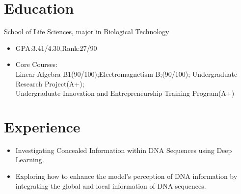 \documentclass{resume}
\begin{document}



\section{Education}

School of Life Sciences, major in Biological Technology 
\begin{itemize}
  \item GPA:3.41/4.30,Rank:27/90
  \item Core Courses: \\Linear Algebra B1(90/100);Electromagnetism B;(90/100); Undergraduate 
  Research Project(A+);\\Undergraduate Innovation and Entrepreneurship Training Program(A+)
\end{itemize}


\section{Experience}

    \begin{itemize}
      \item Investigating Concealed Information within DNA Sequences using Deep Learning.
      \item Exploring how to enhance the model’s perception of DNA information by integrating the global and local information of DNA sequences.
    \end{itemize}
\end{document}
